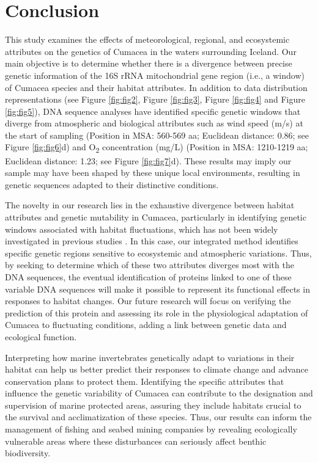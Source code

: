{\section{Conclusion}\label{conclusion}
This study examines the effects of meteorological, regional, and ecosystemic attributes on the genetics of Cumacea in the waters surrounding Iceland. Our main objective is to determine whether there is a divergence between precise genetic information of the 16S rRNA mitochondrial gene region (i.e., a window) of Cumacea species and their habitat attributes. In addition to data distribution representations (see Figure \ref{fig:fig2}, Figure \ref{fig:fig3}, Figure \ref{fig:fig4} and Figure \ref{fig:fig5}), DNA sequence analyses have identified specific genetic windows that diverge from atmospheric and biological attributes such as wind speed (m/s) at the start of sampling (Position in MSA: 560-569 aa; Euclidean distance: 0.86; see Figure \ref{fig:fig6}d) and O\textsubscript{2} concentration (mg/L) (Position in MSA: 1210-1219 aa; Euclidean distance: 1.23; see Figure \ref{fig:fig7}d). These results may imply our sample may have been shaped by these unique local environments, resulting in genetic sequences adapted to their distinctive conditions.

The novelty in our research lies in the exhaustive divergence between habitat attributes and genetic mutability in Cumacea, particularly in identifying genetic windows associated with habitat fluctuations, which has not been widely investigated in previous studies \citep{manel2003landscape, vrijenhoek2009cryptic}. In this case, our integrated method identifies specific genetic regions sensitive to ecosystemic and atmospheric variations. Thus, by seeking to determine which of these two attributes diverges most with the DNA sequences, the eventual identification of proteins linked to one of these variable DNA sequences will make it possible to represent its functional effects in responses to habitat changes. Our future research will focus on verifying the prediction of this protein and assessing its role in the physiological adaptation of Cumacea to fluctuating conditions, adding a link between genetic data and ecological function.

Interpreting how marine invertebrates genetically adapt to variations in their habitat can help us better predict their responses to climate change and advance conservation plans to protect them. Identifying the specific attributes that influence the genetic variability of Cumacea can contribute to the designation and supervision of marine protected areas, assuring they include habitats crucial to the survival and acclimatization of these species. Thus, our results can inform the management of fishing and seabed mining companies by revealing ecologically vulnerable areas where these disturbances can seriously affect benthic biodiversity. 

}
